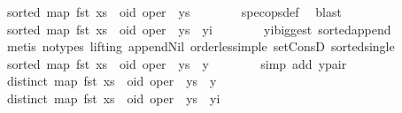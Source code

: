 \begin{isabellebody}
\ {\isachardoublequoteopen}sorted\ {\isacharparenleft}map\ fst\ {\isacharparenleft}xs\ {\isacharat}\ {\isacharbrackleft}{\isacharparenleft}oid{\isacharcomma}\ oper{\isacharparenright}{\isacharbrackright}\ {\isacharat}\ ys{\isacharparenright}{\isacharparenright}{\isachardoublequoteclose}\isanewline
\ \ \ \ \ \ \isamarkupfalse%
\ spec{\isacharunderscore}ops{\isacharunderscore}def\ \isamarkupfalse%
\ blast\isanewline
\ \ \ \ \isamarkupfalse%
\ {\isachardoublequoteopen}sorted\ {\isacharparenleft}map\ fst\ {\isacharparenleft}xs\ {\isacharat}\ {\isacharbrackleft}{\isacharparenleft}oid{\isacharcomma}\ oper{\isacharparenright}{\isacharbrackright}\ {\isacharat}\ ys{\isacharparenright}\ {\isacharat}\ {\isacharbrackleft}yi{\isacharbrackright}{\isacharparenright}{\isachardoublequoteclose}\isanewline
\ \ \ \ \ \ \isamarkupfalse%
\ yi{\isacharunderscore}biggest\ sorted{\isacharunderscore}append\isanewline
\ \ \ \ \ \ \isamarkupfalse%
\ {\isacharparenleft}metis\ {\isacharparenleft}no{\isacharunderscore}types{\isacharcomma}\ lifting{\isacharparenright}\ append{\isacharunderscore}Nil{}\ order{\isacharunderscore}less{\isacharunderscore}imp{\isacharunderscore}le\ set{\isacharunderscore}ConsD\ sorted{\isacharunderscore}single{\isacharparenright}\isanewline
\ \ \ \ \isamarkupfalse%
\ {\isachardoublequoteopen}sorted\ {\isacharparenleft}map\ fst\ {\isacharparenleft}xs\ {\isacharat}\ {\isacharbrackleft}{\isacharparenleft}oid{\isacharcomma}\ oper{\isacharparenright}{\isacharbrackright}\ {\isacharat}\ ys\ {\isacharat}\ {\isacharbrackleft}y{\isacharbrackright}{\isacharparenright}{\isacharparenright}{\isachardoublequoteclose}\isanewline
\ \ \ \ \ \ \isamarkupfalse%
\ {\isacharparenleft}simp\ add{\isacharcolon}\ y{\isacharunderscore}pair{\isacharparenright}\isanewline
\ \ \isamarkupfalse%
\isanewline
\ \ \isamarkupfalse%
\ \isamarkupfalse%
\ {\isachardoublequoteopen}distinct\ {\isacharparenleft}map\ fst\ {\isacharparenleft}xs\ {\isacharat}\ {\isacharbrackleft}{\isacharparenleft}oid{\isacharcomma}\ oper{\isacharparenright}{\isacharbrackright}\ {\isacharat}\ ys\ {\isacharat}\ {\isacharbrackleft}y{\isacharbrackright}{\isacharparenright}{\isacharparenright}{\isachardoublequoteclose}\isanewline
\ \ \isamarkupfalse%
\ {\isacharminus}\isanewline
\ \ \ \ \isamarkupfalse%
\ {\isachardoublequoteopen}distinct\ {\isacharparenleft}map\ fst\ {\isacharparenleft}xs\ {\isacharat}\ {\isacharbrackleft}{\isacharparenleft}oid{\isacharcomma}\ oper{\isacharparenright}{\isacharbrackright}\ {\isacharat}\ ys{\isacharparenright}\ {\isacharat}\ {\isacharbrackleft}yi{\isacharbrackright}{\isacharparenright}{\isachardoublequoteclose}\isanewline

\end{isabellebody}

